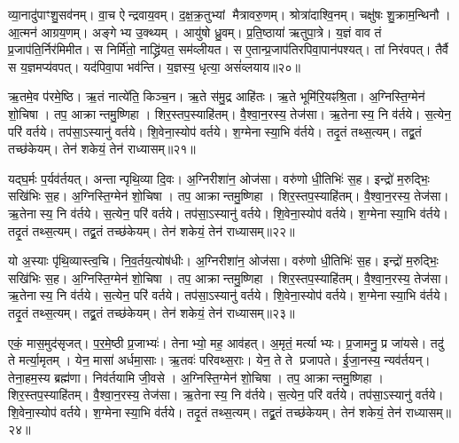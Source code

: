 व्या॒नादु॑पाꣳशु॒सव॑नम्।
वा॒च ऐन्द्रवाय॒वम्।
द॒क्ष॒क्र॒तुभ्यां मैत्रावरु॒णम्।
श्रोत्रा॑दाश्वि॒नम्।
चक्षु॑षः शु॒क्राम॒न्थिनौ।
आ॒त्मन॑ आग्रय॒णम्।
अङ्गेभ्य उ॒क्थ्यम्।
आयु॑षो ध्रु॒वम्।
प्र॒ति॒ष्ठाया॑ ऋतुपा॒त्रे।
य॒ज्ञं वाव तं प्र॒जाप॑ति॒र्निर॑मिमीत।
स निर्मि॑तो॒ नाद्ध्रि॑यत॒ सम॑व्लीयत।
स ए॒तान्प्र॒जाप॑तिरपिवा॒पान॑पश्यत्।
तां निर॑वपत्।
तैर्वै स य॒ज्ञमप्य॑वपत्।
यद॑पिवा॒पा भव॑न्ति।
य॒ज्ञस्य॒ धृत्या॒ असं॑व्लयाय॥२०॥\anuvakamend[उ॒पा॒ꣳ॒श्व॒न्त॒र्या॒मौ निर॑मिमीतामिमीत॒ षट्च॑]

ऋ॒तमे॒व प॑रमे॒ष्ठि।
ऋ॒तं नात्ये॑ति॒ किञ्च॒न।
ऋ॒ते स॑मु॒द्र आहि॑तः।
ऋ॒ते भूमि॑रि॒यꣴश्रि॒ता।
अ॒ग्निस्ति॒ग्मेन॑ शो॒चिषा।
तप॒ आक्रान्तमु॒ष्णिहा।
शिर॒स्तप॒स्याहि॑तम्।
वै॒श्वा॒न॒रस्य॒ तेज॑सा।
ऋ॒तेनास्य॒ नि व॑र्तये।
स॒त्येन॒ परि॑ वर्तये।
तप॑सा॒\-ऽस्यानु॑ वर्तये।
शि॒वेना॒स्योप॑ वर्तये।
श॒ग्मेनास्या॒भि व॑र्तये।
तदृ॒तं तथ्स॒त्यम्।
तद्व्र॒तं तच्छ॑केयम्।
तेन॑ शकेयं॒ तेन॑ राध्यासम्॥२१॥

यद्\mbox{}घ॒र्मः प॒र्यव॑र्तयत्।
अन्तान्पृथि॒व्या दि॒वः।
अ॒ग्निरीशा॑न॒ ओज॑सा।
वरु॑णो धी॒तिभिः॑ स॒ह।
इन्द्रो॑ म॒रुद्भिः॒ सखि॑भिः स॒ह।
अ॒ग्निस्ति॒ग्मेन॑ शो॒चिषा।
तप॒ आक्रान्तमु॒ष्णिहा।
शिर॒स्तप॒स्याहि॑तम्।
वै॒श्वा॒न॒रस्य॒ तेज॑सा।
ऋ॒तेनास्य॒ नि व॑र्तये।
स॒त्येन॒ परि॑ वर्तये।
तप॑सा॒\-ऽस्यानु॑ वर्तये।
शि॒वेना॒स्योप॑ वर्तये।
श॒ग्मेनास्या॒भि व॑र्तये।
तदृ॒तं तथ्स॒त्यम्।
तद्व्र॒तं तच्छ॑केयम्।
तेन॑ शकेयं॒ तेन॑ राध्यासम्॥२२॥

यो अ॒स्याः पृ॑थि॒व्यास्त्व॒चि।
नि॒व॒र्तय॒त्योष॑धीः।
अ॒ग्निरीशा॑न॒ ओज॑सा।
वरु॑णो धी॒तिभिः॑ स॒ह।
इन्द्रो॑ म॒रुद्भिः॒ सखि॑भिः स॒ह।
अ॒ग्निस्ति॒ग्मेन॑ शो॒चिषा।
तप॒ आक्रान्तमु॒ष्णिहा।
शिर॒स्तप॒स्याहि॑तम्।
वै॒श्वा॒न॒रस्य॒ तेज॑सा।
ऋ॒तेनास्य॒ नि व॑र्तये।
स॒त्येन॒ परि॑ वर्तये।
तप॑सा॒\-ऽस्यानु॑ वर्तये।
शि॒वेना॒स्योप॑ वर्तये।
श॒ग्मेनास्या॒भि व॑र्तये।
तदृ॒तं तथ्स॒त्यम्।
तद्व्र॒तं तच्छ॑केयम्।
तेन॑ शकेयं॒ तेन॑ राध्यासम्॥२३॥

एकं॒ मास॒मुद॑सृजत्।
प॒र॒मे॒ष्ठी प्र॒जाभ्यः॑।
तेनाभ्यो॒ मह॒ आव॑हत्।
अ॒मृतं॒ मर्त्याभ्यः।
प्र॒जामनु॒ प्र जा॑यसे।
तदु॑ ते मर्त्या॒मृतम्।
येन॒ मासा॑ अर्धमा॒साः।
ऋ॒तवः॑ परिवथ्स॒राः।
येन॒ ते ते प्रजापते।
ई॒जा॒नस्य॒ न्यव॑र्तयन्।
तेना॒हम॒स्य ब्रह्म॑णा।
निव॑र्तयामि जी॒वसे।
अ॒ग्निस्ति॒ग्मेन॑ शो॒चिषा।
तप॒ आक्रान्तमु॒ष्णिहा।
शिर॒स्तप॒स्याहि॑तम्।
वै॒श्वा॒न॒रस्य॒ तेज॑सा।
ऋ॒तेनास्य॒ नि व॑र्तये।
स॒त्येन॒ परि॑ वर्तये।
तप॑सा॒\-ऽस्यानु॑ वर्तये।
शि॒वेना॒स्योप॑ वर्तये।
श॒ग्मेनास्या॒भि व॑र्तये।
तदृ॒तं तथ्स॒त्यम्।
तद्व्र॒तं तच्छ॑केयम्।
तेन॑ शकेयं॒ तेन॑ राध्यासम्॥२४॥

